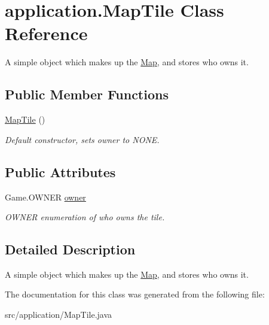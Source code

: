 \hypertarget{classapplication_1_1_map_tile}{\section{application.\+Map\+Tile Class Reference}
\label{classapplication_1_1_map_tile}
}


A simple object which makes up the \hyperlink{classapplication_1_1_map}{Map}, and stores who owns it.  


\subsection*{Public Member Functions}
\begin{DoxyCompactItemize}
\item 
\hypertarget{classapplication_1_1_map_tile_a05f16549a120e72840b79f668af59c4a}{\hyperlink{classapplication_1_1_map_tile_a05f16549a120e72840b79f668af59c4a}{Map\+Tile} ()}\label{classapplication_1_1_map_tile_a05f16549a120e72840b79f668af59c4a}

\begin{DoxyCompactList}\small\item\em Default constructor, sets owner to N\+O\+N\+E. \end{DoxyCompactList}\end{DoxyCompactItemize}
\subsection*{Public Attributes}
\begin{DoxyCompactItemize}
\item 
\hypertarget{classapplication_1_1_map_tile_a720b9fc0678031d85d5e676a0a0cb49f}{Game.\+O\+W\+N\+E\+R \hyperlink{classapplication_1_1_map_tile_a720b9fc0678031d85d5e676a0a0cb49f}{owner}}\label{classapplication_1_1_map_tile_a720b9fc0678031d85d5e676a0a0cb49f}

\begin{DoxyCompactList}\small\item\em O\+W\+N\+E\+R enumeration of who owns the tile. \end{DoxyCompactList}\end{DoxyCompactItemize}


\subsection{Detailed Description}
A simple object which makes up the \hyperlink{classapplication_1_1_map}{Map}, and stores who owns it. 

The documentation for this class was generated from the following file\+:\begin{DoxyCompactItemize}
\item 
src/application/Map\+Tile.\+java\end{DoxyCompactItemize}
